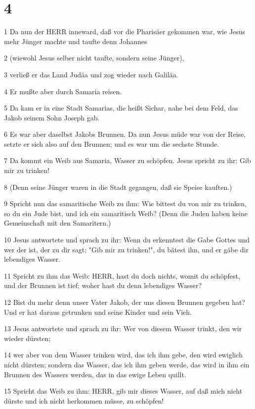 \chapter{4}

\par 1 Da nun der HERR inneward, daß vor die Pharisäer gekommen war, wie Jesus mehr Jünger machte und taufte denn Johannes
\par 2 (wiewohl Jesus selber nicht taufte, sondern seine Jünger),
\par 3 verließ er das Land Judäa und zog wieder nach Galiläa.
\par 4 Er mußte aber durch Samaria reisen.
\par 5 Da kam er in eine Stadt Samarias, die heißt Sichar, nahe bei dem Feld, das Jakob seinem Sohn Joseph gab.
\par 6 Es war aber daselbst Jakobs Brunnen. Da nun Jesus müde war von der Reise, setzte er sich also auf den Brunnen; und es war um die sechste Stunde.
\par 7 Da kommt ein Weib aus Samaria, Wasser zu schöpfen. Jesus spricht zu ihr: Gib mir zu trinken!
\par 8 (Denn seine Jünger waren in die Stadt gegangen, daß sie Speise kauften.)
\par 9 Spricht nun das samaritische Weib zu ihm: Wie bittest du von mir zu trinken, so du ein Jude bist, und ich ein samaritisch Weib? (Denn die Juden haben keine Gemeinschaft mit den Samaritern.)
\par 10 Jesus antwortete und sprach zu ihr: Wenn du erkenntest die Gabe Gottes und wer der ist, der zu dir sagt: "Gib mir zu trinken!", du bätest ihn, und er gäbe dir lebendiges Wasser.
\par 11 Spricht zu ihm das Weib: HERR, hast du doch nichts, womit du schöpfest, und der Brunnen ist tief; woher hast du denn lebendiges Wasser?
\par 12 Bist du mehr denn unser Vater Jakob, der uns diesen Brunnen gegeben hat? Und er hat daraus getrunken und seine Kinder und sein Vieh.
\par 13 Jesus antwortete und sprach zu ihr: Wer von diesem Wasser trinkt, den wir wieder dürsten;
\par 14 wer aber von dem Wasser trinken wird, das ich ihm gebe, den wird ewiglich nicht dürsten; sondern das Wasser, das ich ihm geben werde, das wird in ihm ein Brunnen des Wassers werden, das in das ewige Leben quillt.
\par 15 Spricht das Weib zu ihm: HERR, gib mir dieses Wasser, auf daß mich nicht dürste und ich nicht herkommen müsse, zu schöpfen!
